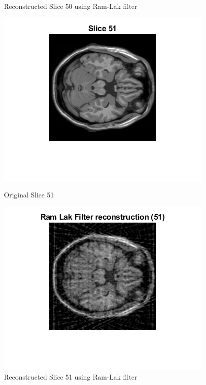 \documentclass[12pt]{article}
\begin{document}
\begin{enumerate}[label = (\alph*)]
\begin{figure}[H]
\begin{minipage}{.45\textwidth}
            \caption*{Reconstructed Slice 50 using Ram-Lak filter}
        \end{minipage}
    \end{figure}
    \begin{figure}[H]
        \centering
        \begin{minipage}{.45\textwidth}
            \centering
            \includegraphics[width=\linewidth]{Images/Q3_51.png}
            \caption*{Original Slice 51}
        \end{minipage}
        \begin{minipage}{.45\textwidth}
            \centering
            \includegraphics[width=\linewidth]{Images/Q3_Extra_51_a.png}
            \caption*{Reconstructed Slice 51 using Ram-Lak filter}
        \end{minipage}
    \end{figure}    


\end{enumerate}
\end{document}
